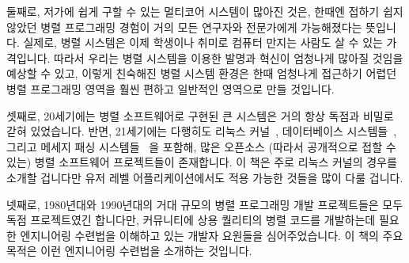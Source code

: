 둘째로, 저가에 쉽게 구할 수 있는 멀티코어 시스템이 많아진 것은, 한때엔 접하기
쉽지 않았던 병렬 프로그래밍 경험이 거의 모든 연구자와 전문가에게 가능해졌다는
뜻입니다.  실제로, 병렬 시스템은 이제 학생이나 취미로 컴퓨터 만지는 사람도 살
수 있는 가격입니다.  따라서 우리는 병렬 시스템을 이용한 발명과 혁신이 엄청나게
많아질 것임을 예상할 수 있고, 이렇게 친숙해진 병렬 시스템 환경은 한때 엄청나게
접근하기 어렵던 병렬 프로그래밍 영역을 훨씬 편하고 일반적인 영역으로 만들
것입니다.

셋째로, 20세기에는 병렬 소프트웨어로 구현된 큰 시스템은 거의 항상 독점과 비밀로
갇혀 있었습니다.  반면, 21세기에는 다행히도 리눅스
커널~\cite{Torvalds2.6kernel}, 데이터베이스
시스템들~\cite{PostgreSQL2008,MySQL2008}, 그리고 메세지 패싱
시스템들~\cite{OpenMPI2008,BOINC2008} 을 포함해, 많은 오픈소스 (따라서
공개적으로 접할 수 있는) 병렬 소프트웨어 프로젝트들이 존재합니다.
이 책은 주로 리눅스 커널의 경우를 소개할 겁니다만 유저 레벨 어플리케이션에서도
적용 가능한 것들을 많이 다룰 겁니다.

넷째로, 1980년대와 1990년대의 거대 규모의 병렬 프로그래밍 개발 프로젝트들은
모두 독점 프로젝트였긴 합니다만, 커뮤니티에 상용 퀄리티의 병렬 코드를
개발하는데 필요한 엔지니어링 수련법을 이해하고 있는 개발자 요원들을
심어주었습니다.  이 책의 주요 목적은 이런 엔지니어링 수련법을 소개하는
것입니다.

